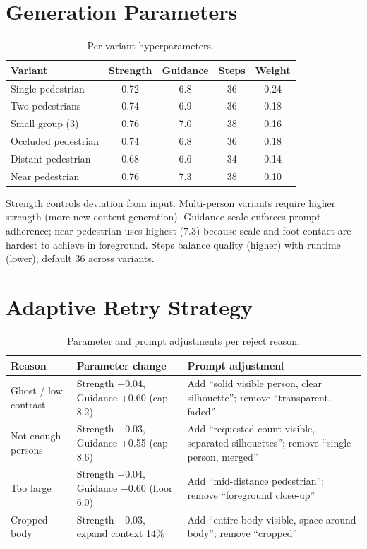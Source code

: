 \documentclass[12pt,a4paper]{article}
\begin{document}
\section{Generation Parameters}

\begin{table}[H]
\centering
\caption{Per-variant hyperparameters.}
\label{tab:gen_params}
\begin{tabular}{lcccc}
\toprule
\textbf{Variant} & \textbf{Strength} & \textbf{Guidance} & \textbf{Steps} & \textbf{Weight} \\
\midrule
Single pedestrian   & 0.72 & 6.8 & 36 & 0.24 \\
Two pedestrians     & 0.74 & 6.9 & 36 & 0.18 \\
Small group (3)     & 0.76 & 7.0 & 38 & 0.16 \\
Occluded pedestrian & 0.74 & 6.8 & 36 & 0.18 \\
Distant pedestrian  & 0.68 & 6.6 & 34 & 0.14 \\
Near pedestrian     & 0.76 & 7.3 & 38 & 0.10 \\
\bottomrule
\end{tabular}
\end{table}

Strength controls deviation from input. Multi-person variants require higher strength (more new content generation). Guidance scale enforces prompt adherence; near-pedestrian uses highest (7.3) because scale and foot contact are hardest to achieve in foreground. Steps balance quality (higher) with runtime (lower); default 36 across variants.

\section{Adaptive Retry Strategy}

\begin{table}[H]
\centering
\caption{Parameter and prompt adjustments per reject reason.}
\label{tab:retry}
\begin{tabular}{p{3.5cm}p{3.5cm}p{4cm}}
\toprule
\textbf{Reason} & \textbf{Parameter change} & \textbf{Prompt adjustment} \\
\midrule
Ghost / low contrast & Strength +0.04, Guidance +0.60 (cap 8.2) & Add ``solid visible person, clear silhouette''; remove ``transparent, faded'' \\[4pt]
Not enough persons & Strength +0.03, Guidance +0.55 (cap 8.6) & Add ``requested count visible, separated silhouettes''; remove ``single person, merged'' \\[4pt]
Too large & Strength $-$0.04, Guidance $-$0.60 (floor 6.0) & Add ``mid-distance pedestrian''; remove ``foreground close-up'' \\[4pt]
Cropped body & Strength $-$0.03, expand context 14\% & Add ``entire body visible, space around body''; remove ``cropped'' \\
\bottomrule
\end{tabular}
\end{table}
\end{document}
